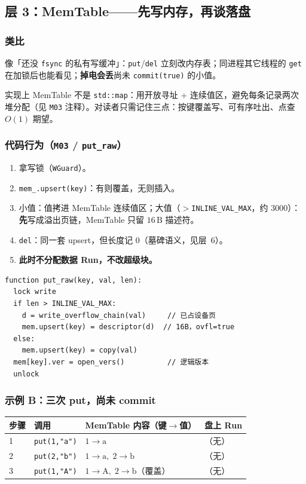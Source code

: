 \subsection{层 3：MemTable——先写内存，再谈落盘}
\label{sec:cd-mem}

\subsubsection{类比}
像「还没 \texttt{fsync} 的私有写缓冲」：\texttt{put}/\texttt{del} 立刻改内存表；同进程其它线程的 \texttt{get} 在加锁后也能看见；\textbf{掉电会丢}尚未 \texttt{commit(true)} 的小值。

实现上 MemTable 不是 \texttt{std::map}：用开放寻址 + 连续值区，避免每条记录两次堆分配（见 \texttt{M03} 注释）。对读者只需记住三点：按键覆盖写、可有序吐出、点查 $O(1)$ 期望。

\subsubsection{代码行为（\texttt{M03} / \texttt{put\_raw}）}
\begin{enumerate}[leftmargin=1.6em]
  \item 拿写锁（\texttt{WGuard}）。
  \item \texttt{mem\_.upsert(key)}：有则覆盖，无则插入。
  \item 小值：值拷进 MemTable 连续值区；大值（$>$\texttt{INLINE\_VAL\_MAX}，约 $3000$）：\textbf{先}写成溢出页链，MemTable 只留 $16\,\mathrm{B}$ 描述符。
  \item \texttt{del}：同一套 upsert，但长度记 $0$（墓碑语义，见层~6）。
  \item \textbf{此时不分配数据 Run，不改超级块。}
\end{enumerate}

\begin{lstlisting}[language=pseudo,caption={put 热路径（对照 Store::put\_raw）}]
function put_raw(key, val, len):
  lock write
  if len > INLINE_VAL_MAX:
    d = write_overflow_chain(val)     // 已占设备页
    mem.upsert(key) = descriptor(d)  // 16B，ovfl=true
  else:
    mem.upsert(key) = copy(val)
  mem[key].ver = open_vers()          // 逻辑版本
  unlock
\end{lstlisting}

\subsubsection{示例 B：三次 put，尚未 commit}
\begin{center}
\small
\begin{tabular}{@{}llll@{}}
\toprule
步骤 & 调用 & MemTable 内容（键$\to$值） & 盘上 Run \\
\midrule
1 & \texttt{put(1,"a")} & $1\to\mathrm{a}$ & （无） \\
2 & \texttt{put(2,"b")} & $1\to\mathrm{a},\;2\to\mathrm{b}$ & （无） \\
3 & \texttt{put(1,"A")} & $1\to\mathrm{A},\;2\to\mathrm{b}$（覆盖） & （无） \\
\bottomrule
\end{tabular}
\end{center}

